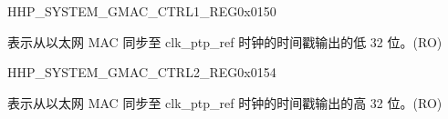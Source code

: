 \begin{register}{H}{HP\_SYSTEM\_GMAC\_CTRL1\_REG}{0x0150}\label{regdesc:HPSYSTEMGMACCTRL1REG}
%
\regnewline%
\begin{regdesc}\begin{reglist}
\label{fielddesc:HPSYSTEMSYSPTPTIMESTAMPL}\item [HP\_SYSTEM\_SYS\_PTP\_TIMESTAMP\_L] 表示从以太网 MAC 同步至 clk\_ptp\_ref 时钟的时间戳输出的低 32 位。(RO)
\end{reglist}\end{regdesc}
\end{register}


\begin{register}{H}{HP\_SYSTEM\_GMAC\_CTRL2\_REG}{0x0154}\label{regdesc:HPSYSTEMGMACCTRL2REG}
%
\regnewline%
\begin{regdesc}\begin{reglist}
\label{fielddesc:HPSYSTEMSYSPTPTIMESTAMPH}\item [HP\_SYSTEM\_SYS\_PTP\_TIMESTAMP\_H] 表示从以太网 MAC 同步至 clk\_ptp\_ref 时钟的时间戳输出的高 32 位。(RO)
\end{reglist}\end{regdesc}
\end{register}


